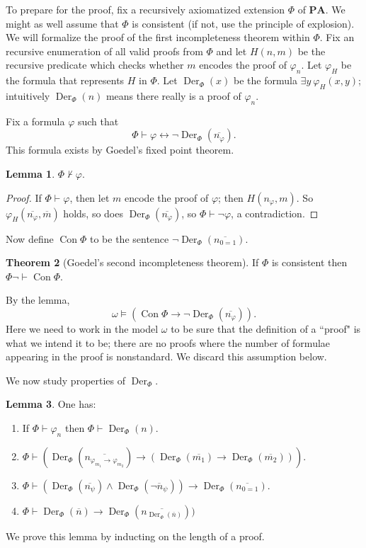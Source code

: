 \documentclass[12pt]{report}
\DeclareMathOperator{\Der}{Der}
\renewcommand{\iff}{\leftrightarrow}
\newcommand{\PA}{\mathbf{PA}}
\newcommand{\proves}{\vdash}
\DeclareMathOperator{\Con}{Con}
\theoremstyle{definition}
\newtheorem{theorem}{Theorem}[chapter]
\newtheorem{lemma}[theorem]{Lemma}
\begin{document}
To prepare for the proof, fix a recursively axiomatized extension $\Phi$ of $\PA$. We might as well assume that $\Phi$ is consistent (if not, use the principle of explosion). We will formalize the proof of the first incompleteness theorem within $\Phi$.
Fix an recursive enumeration of all valid proofs from $\Phi$ and let $H(n, m)$ be the recursive predicate which checks whether $m$ encodes the proof of $\varphi_n$.
Let $\varphi_H$ be the formula that represents $H$ in $\Phi$. Let $\Der_\Phi(x)$ be the formula $\exists y~\varphi_H(x, y)$; intuitively $\Der_\Phi(n)$ means there really is a proof of $\varphi_n$.

Fix a formula $\varphi$ such that
$$\Phi \proves \varphi \iff \neg \Der_\Phi(\overline{n_\varphi}).$$
This formula exists by Goedel's fixed point theorem.
\begin{lemma}
$\Phi \not\proves \varphi$.
\end{lemma}
\begin{proof}
If $\Phi \proves \varphi$, then let $m$ encode the proof of $\varphi$; then $H(n_\varphi, m)$. So $\varphi_H(\overline{n_\varphi}, \overline m)$ holds, so does $\Der_\Phi(\overline{n_\varphi})$, so $\Phi \proves \neg\varphi$, a contradiction.
\end{proof}

Now define $\Con \Phi$ to be the sentence $\neg \Der_\Phi(\overline{n_{0=1}})$.
\begin{theorem}[Goedel's second incompleteness theorem]
If $\Phi$ is consistent then $\Phi \neg \proves \Con \Phi$.
\end{theorem}
By the lemma,
$$\omega \models (\Con \Phi \to \neg \Der_\Phi(\overline{n_\varphi})).$$
Here we need to work in the model $\omega$ to be sure that the definition of a ``proof" is what we intend it to be; there are no proofs where the number of formulae appearing in the proof is nonstandard.
We discard this assumption below.

We now study properties of $\Der_\Phi$.
\begin{lemma}
One has:
\begin{enumerate}
\item If $\Phi \proves \varphi_n$ then $\Phi \proves \Der_\Phi(n)$.
\item $\Phi \proves (\Der_\Phi(\overline{n_{\varphi_{m_1} \to \varphi_{m_2}}}) \to (\Der_\Phi(\overline{m_1}) \to \Der_\Phi(\overline{m_2})))$.
\item $\Phi \proves (\Der_\Phi(\overline{n_\psi}) \wedge \Der_\Phi(\overline{\neg n_\psi})) \to \Der_\Phi(\overline{n_{0=1}})$.
\item $\Phi \proves \Der_\Phi(\overline n) \to \Der_\Phi(\overline{n_{\Der_\Phi(\overline n)}}))$
\end{enumerate}
\end{lemma}
We prove this lemma by inducting on the length of a proof.
\end{document}
